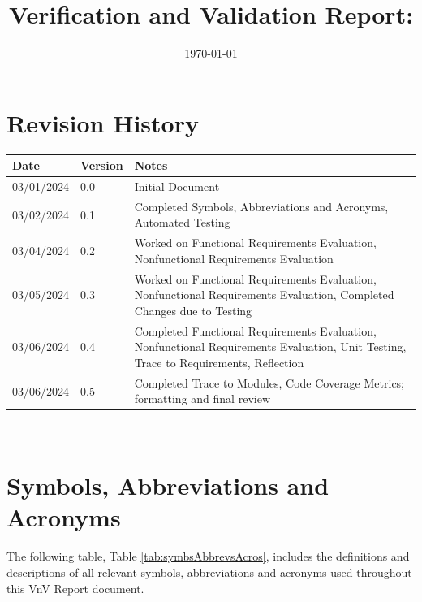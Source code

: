 \documentclass[12pt, titlepage]{article}
\begin{document}
\title{Verification and Validation Report: \progname} 
\author{\authname}
\date{\today}
  
\maketitle


\section{Revision History}

\begin{tabularx}{\textwidth}{p{3cm}p{2cm}X}
\toprule {\bf Date} & {\bf Version} & {\bf Notes}\\
\midrule
03/01/2024 & 0.0 & Initial Document \\
03/02/2024 & 0.1 & Completed Symbols, Abbreviations and Acronyms, Automated Testing \\
03/04/2024 & 0.2 & Worked on Functional Requirements Evaluation, Nonfunctional Requirements Evaluation \\
03/05/2024 & 0.3 & Worked on Functional Requirements Evaluation, Nonfunctional Requirements Evaluation, Completed Changes due to Testing \\
03/06/2024 & 0.4 & Completed Functional Requirements Evaluation, Nonfunctional Requirements Evaluation, Unit Testing, Trace to Requirements, Reflection \\
03/06/2024 & 0.5 & Completed Trace to Modules, Code Coverage Metrics; formatting and final review \\
\bottomrule
\end{tabularx}

~\newpage

\section{Symbols, Abbreviations and Acronyms}
The following table, Table \ref{tab:symbsAbbrevsAcros}, includes the definitions and descriptions of all relevant symbols, abbreviations and acronyms used throughout this VnV Report document.
\end{document}
